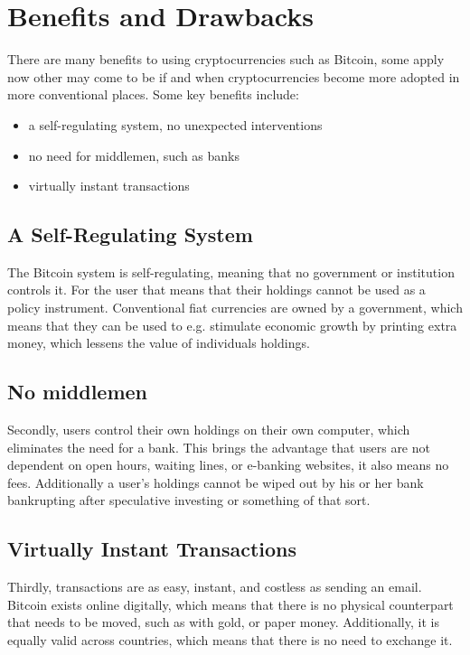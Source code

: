 
\chapter{Benefits and Drawbacks}

There are many benefits to using cryptocurrencies such as Bitcoin,
some apply now other may come to be if and when cryptocurrencies become
more adopted in more conventional places. Some key benefits include:
\begin{itemize}
\item a self-regulating system, no unexpected interventions
\item no need for middlemen, such as banks
\item virtually instant transactions
\end{itemize}

\section*{A Self-Regulating System}

The Bitcoin system is self-regulating, meaning that no government
or institution controls it. For the user that means that their holdings
cannot be used as a policy instrument. Conventional fiat currencies
are owned by a government, which means that they can be used to e.g.
stimulate economic growth by printing extra money, which lessens the
value of individuals holdings.


\section*{No middlemen}

Secondly, users control their own holdings on their own computer,
which eliminates the need for a bank. This brings the advantage that
users are not dependent on open hours, waiting lines, or e-banking
websites, it also means no fees. Additionally a user's holdings cannot
be wiped out by his or her bank bankrupting after speculative investing
or something of that sort.


\section*{Virtually Instant Transactions}

Thirdly, transactions are as easy, instant, and costless as sending
an email. Bitcoin exists online digitally, which means that there
is no physical counterpart that needs to be moved, such as with gold,
or paper money. Additionally, it is equally valid across countries,
which means that there is no need to exchange it. 


